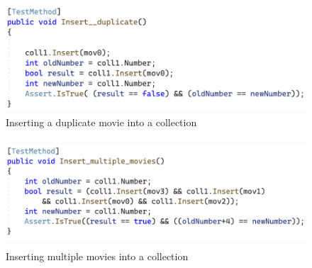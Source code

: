 \documentclass[a4paper]{article}
\begin{document}
\begin{figure}[H]
    \includegraphics[height=4cm]{data/Insert__duplicate.png}
    \caption{Inserting a duplicate movie into a collection}
\end{figure}
\begin{figure}[H]
    \includegraphics[height=4cm]{data/Insert_multiple_movies.png}
    \caption{Inserting multiple movies into a collection}
\end{figure}
\end{document}
